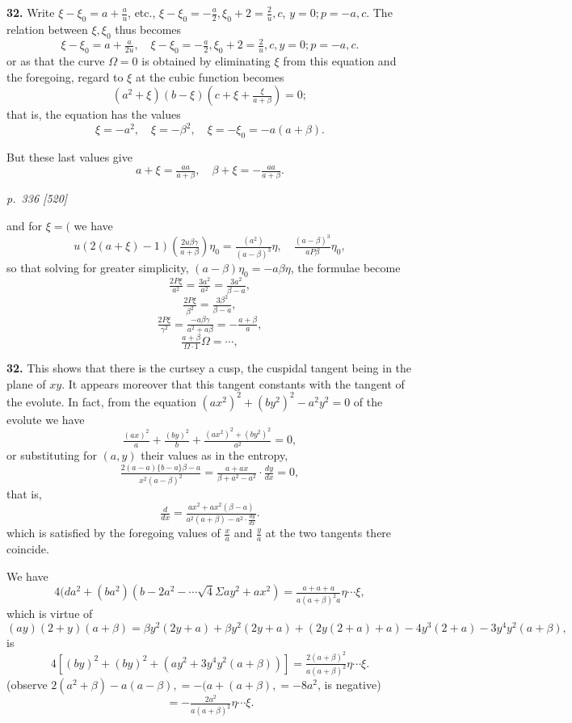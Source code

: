 \documentclass[11pt,a4paper]{article}
\theoremstyle{plain}
\theoremstyle{definition}
\begin{document}
\textbf{32.} Write $\xi - \xi_0 = a + \tfrac{a}{u}$, etc., $\xi - \xi_0 = -\tfrac{a}{2}, \xi_0 + 2 = \tfrac{2}{u}, c$, $y = 0; p = -a, c$. The relation between $\xi, \xi_0$ thus becomes
\[
\xi - \xi_0 = a + \tfrac{a}{2u}, \quad \xi - \xi_0 = -\tfrac{a}{2}, \xi_0 + 2 = \tfrac{2}{u}, c, y = 0; p = -a, c.
\]
or as that the curve $\Omega = 0$ is obtained by eliminating $\xi$ from this equation and the foregoing, regard to $\xi$ at the cubic function becomes
\[
(a^2 + \xi)(b - \xi)\!\left(c + \xi + \tfrac{\xi}{a + \beta}\right) = 0;
\]
that is, the equation has the values
\[
\xi = -a^2, \quad \xi = -\beta^2, \quad \xi = -\xi_0 = -a(a + \beta).
\]

But these last values give
\[
a + \xi = \tfrac{a a}{a + \beta}, \quad \beta + \xi = -\tfrac{a a}{a + \beta}.
\]

\clearpage

\bigskip
\textit{p.~336 [520]}
\smallskip

and for $\xi = ($ we have
\[
u(2(a + \xi) - 1)\!\left(\tfrac{2u\beta\gamma}{a + \beta}\right)\eta_0 = \tfrac{(a^2)}{(a - \beta)^3}\eta, \quad \tfrac{(a - \beta)^3}{a P\beta}\eta_0,
\]
so that solving for greater simplicity, $(a - \beta)\eta_0 = -a\beta\eta$, the formulae become
\[
\tfrac{2P\xi}{a^2} = \tfrac{3a^2}{a^2} = \tfrac{3a^2}{\beta - a},
\]
\[
\tfrac{2P\xi}{\beta^2} = \tfrac{3\beta^2}{\beta - a},
\]
\[
\tfrac{2P\xi}{\gamma^2} = \tfrac{-a\beta\gamma}{a^2 + a\beta} = -\tfrac{a + \beta}{a},
\]
\[
\tfrac{a + \beta}{\Omega \cdot 1}\Omega = \cdots,
\]

\textbf{32.} This shows that there is the curtsey a cusp, the cuspidal tangent being in the plane of $xy$. It appears moreover that this tangent constants with the tangent of the evolute. In fact, from the equation $(a x^2)^2 + (b y^2)^2 - a^2 y^2 = 0$ of the evolute we have
\[
\tfrac{(a x)^2}{a} + \tfrac{(b y)^2}{b} + \tfrac{(a x^2)^2 + (b y^2)^2}{a^2} = 0,
\]
or substituting for $(a, y)$ their values as in the entropy,
\[
\tfrac{2(a - a)\{b - a\}\beta - a}{x^2(a - \beta)^2} = \tfrac{a + a x}{\beta + a^2 - a^2}\cdot\tfrac{dy}{dx} = 0,
\]
that is,
\[
\tfrac{d}{dx} = \tfrac{a x^2 + a x^2(\beta - a)}{a^2(a + \beta) - a^2\cdot\tfrac{dy}{dx}}.
\]
which is satisfied by the foregoing values of $\tfrac{x}{a}$ and $\tfrac{y}{a}$ at the two tangents there coincide.

We have
\[
4(da^2 + (b a^2)(b - 2a^2 - \cdots\sqrt{4}\Sigma a y^2 + a x^2) = \tfrac{a + a + a}{a(a + \beta)^2 a}\eta\cdots\xi,
\]
which is virtue of
\[
(a y)(2 + y)(a + \beta) = \beta y^2(2y + a) + \beta y^2(2y + a) + (2y(2 + a) + a) - 4y^3(2 + a) - 3y^4 y^2(a + \beta),
\]
is
\[
4[(b y)^2 + (b y)^2 + (a y^2 + 3y^4 y^2(a + \beta))] = \tfrac{2(a + \beta)^2}{a(a + \beta)^2}\eta\cdots\xi.
\]
(observe $2(a^2 + \beta) - a(a - \beta), = -(a + (a + \beta), = -8a^2$, is negative)
\[
= -\tfrac{2a^2}{a(a + \beta)^2}\eta\cdots\xi.
\]
\end{document}
